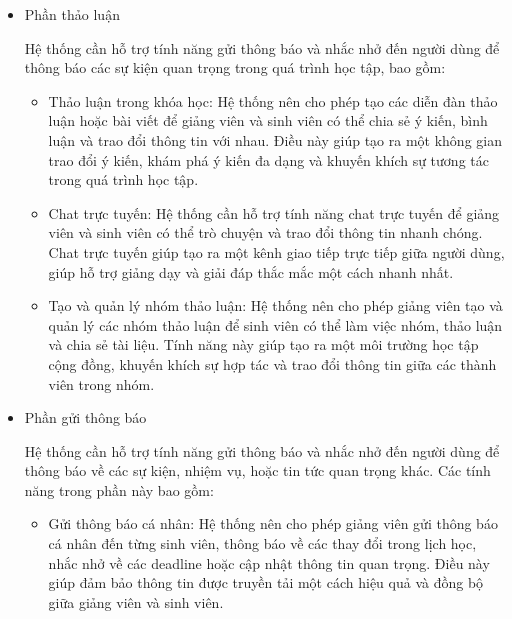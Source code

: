 \documentclass[../Thesis.tex]{subfiles}
\begin{document}
            \begin{itemize}
                \item {Phần thảo luận}
                
                    Hệ thống cần hỗ trợ tính năng gửi thông báo và nhắc nhở đến người dùng để thông báo các sự kiện quan trọng trong quá trình học tập, bao gồm:
                    \begin{itemize}
                        \item Thảo luận trong khóa học: Hệ thống nên cho phép tạo các diễn đàn thảo luận hoặc bài viết để giảng viên và sinh viên có thể chia sẻ ý kiến, bình luận và trao đổi thông tin với nhau. Điều này giúp tạo ra một không gian trao đổi ý kiến, khám phá ý kiến đa dạng và khuyến khích sự tương tác trong quá trình học tập.

                        \item Chat trực tuyến: Hệ thống cần hỗ trợ tính năng chat trực tuyến để giảng viên và sinh viên có thể trò chuyện và trao đổi thông tin nhanh chóng. Chat trực tuyến giúp tạo ra một kênh giao tiếp trực tiếp giữa người dùng, giúp hỗ trợ giảng dạy và giải đáp thắc mắc một cách nhanh nhất.

                        \item Tạo và quản lý nhóm thảo luận: Hệ thống nên cho phép giảng viên tạo và quản lý các nhóm thảo luận để sinh viên có thể làm việc nhóm, thảo luận và chia sẻ tài liệu. Tính năng này giúp tạo ra một môi trường học tập cộng đồng, khuyến khích sự hợp tác và trao đổi thông tin giữa các thành viên trong nhóm.

                    \end{itemize}

                \item {Phần gửi thông báo}
                
                    Hệ thống cần hỗ trợ tính năng gửi thông báo và nhắc nhở đến người dùng để thông báo về các sự kiện, nhiệm vụ, hoặc tin tức quan trọng khác. Các tính năng trong phần này bao gồm:
                    \begin{itemize}
                    
                        \item Gửi thông báo cá nhân: Hệ thống nên cho phép giảng viên gửi thông báo cá nhân đến từng sinh viên, thông báo về các thay đổi trong lịch học, nhắc nhở về các deadline hoặc cập nhật thông tin quan trọng. Điều này giúp đảm bảo thông tin được truyền tải một cách hiệu quả và đồng bộ giữa giảng viên và sinh viên.
                        

\end{itemize}
\end{itemize}
\end{document}
